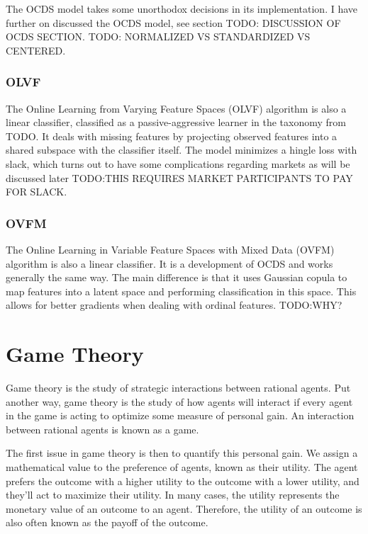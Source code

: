 The OCDS model takes some unorthodox decisions in its implementation. I have
further on discussed the OCDS model, see section TODO: DISCUSSION OF OCDS
SECTION. 
TODO: NORMALIZED VS STANDARDIZED VS CENTERED.

\subsubsection{OLVF}

The Online Learning from Varying Feature Spaces (OLVF) algorithm is also a
linear classifier, classified as a passive-aggressive learner in the taxonomy
from TODO. It deals with missing features by projecting observed features into
a shared subspace with the classifier itself. The model minimizes a hingle loss
with slack, which turns out to have some complications regarding markets as
will be discussed later TODO:THIS REQUIRES MARKET PARTICIPANTS TO PAY FOR
SLACK.

\subsubsection{OVFM}
The Online Learning in Variable Feature Spaces with Mixed Data (OVFM) algorithm
is also a linear classifier. It is a development of OCDS and works generally the
same way. The main difference is that it uses Gaussian copula to map features
into a latent space and performing classification in this space. This allows
for better gradients when dealing with ordinal features. TODO:WHY?

\section{Game Theory}

Game theory is the study of strategic interactions between rational agents. Put
another way, game theory is the study of how agents will interact if every
agent in the game is acting to optimize some measure of personal gain. An
interaction between rational agents is known as a game. 

The first issue in game theory is then to quantify this personal gain. We
assign a mathematical value to the preference of agents, known as their
utility. The agent prefers the outcome with a higher utility to the outcome
with a lower utility, and they'll act to maximize their utility. In many cases,
the utility represents the monetary value of an outcome to an agent. Therefore,
the utility of an outcome is also often known as the payoff of the outcome.

